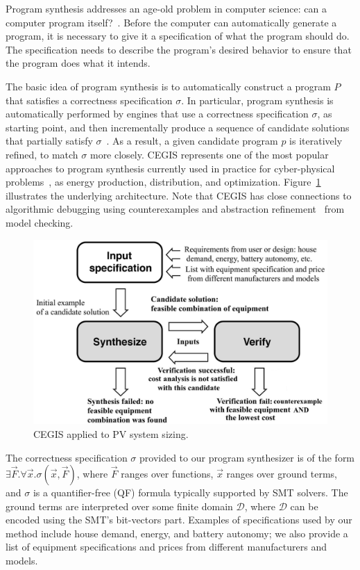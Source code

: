 \documentclass[journal]{IEEEtran}
\begin{document}
Program synthesis addresses an age-old problem in computer science: can a computer program itself?~\cite{Bornholt2019}. Before the computer can automatically generate a program, it is necessary to give it a specification of what the program should do. The specification needs to describe the program's desired behavior to ensure that the program does what it intends.

The basic idea of program synthesis is to automatically construct a program $P$ that satisfies a correctness specification $\sigma$. In particular, program synthesis is automatically performed by engines that use a correctness specification $\sigma$, as starting point, and then incrementally produce a sequence of candidate solutions that partially satisfy $\sigma$~\cite{Abateetal2017}. As a result, a given candidate program $p$ is iteratively refined, to match $\sigma$ more closely. CEGIS represents one of the most popular approaches to program synthesis currently used in practice for cyber-physical problems~\cite{Abateetal2017}, as energy production, distribution, and optimization. Figure~\ref{Counter-Example-Guided-Inductive-Synthesis} illustrates the underlying architecture. Note that CEGIS has close connections to algorithmic debugging using counterexamples and abstraction refinement~\cite{Alur} from model checking.
%
\begin{figure}[h]
	\centering
	\includegraphics[width=0.75\columnwidth]{fig2_rev2.jpg}
	\caption{CEGIS applied to PV system sizing.}
	\label{Counter-Example-Guided-Inductive-Synthesis}
\end{figure}

The correctness specification $\sigma$ provided to our program synthesizer is of the form $\exists \vec{F} . \forall \vec{x}. \sigma(\vec{x}, \vec{F})$, where $\vec{F}$ ranges over functions, $\vec{x}$ ranges over ground terms, and $\sigma$ is a quantifier-free (QF) formula typically supported by SMT solvers. The ground terms are interpreted over some finite domain $\mathcal{D}$, where $\mathcal{D}$ can be encoded using the SMT's bit-vectors part. Examples of specifications used by our method include house demand, energy, and battery autonomy; we also provide a list of equipment specifications and prices from different manufacturers and models.
\end{document}
